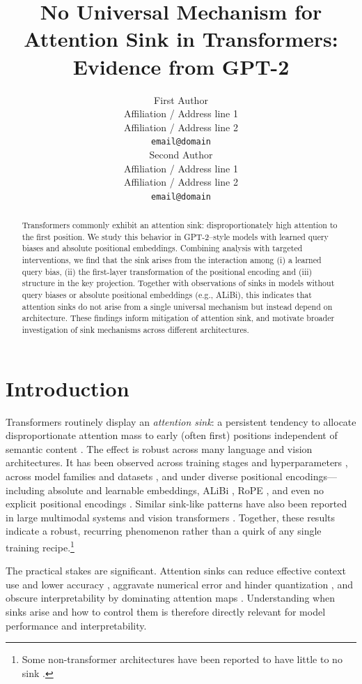 \documentclass[11pt]{article}
\title{No Universal Mechanism for Attention Sink in Transformers: \\Evidence from GPT-2}
\author{First Author \\
  Affiliation / Address line 1 \\
  Affiliation / Address line 2 \\
  \texttt{email@domain} \\\And
  Second Author \\
  Affiliation / Address line 1 \\
  Affiliation / Address line 2 \\
  \texttt{email@domain} \\
}
\date{}
\begin{document}
\maketitle

\begin{abstract}
  Transformers commonly exhibit an attention sink: disproportionately high attention to the first position. We study this behavior in GPT-2–style models with learned query biases and absolute positional embeddings. Combining analysis with targeted interventions, we find that the sink arises from the interaction among (i) a learned query bias, (ii) the first-layer transformation of the positional encoding and (iii) structure in the key projection. Together with observations of sinks in models without query biases or absolute positional embeddings (e.g., ALiBi), this indicates that attention sinks do not arise from a single universal mechanism but instead depend on architecture. These findings inform mitigation of attention sink, and motivate broader investigation of sink mechanisms across different architectures.
\end{abstract}

\section{Introduction}\label{sec:intro}

Transformers \cite{vaswani2023attentionneed} routinely display an \emph{attention sink}: a persistent tendency to allocate disproportionate attention mass to early (often first) positions independent of semantic content \citep{xiao2023efficient,gu2025when}. The effect is robust across many language and vision architectures. It has been observed across training stages and hyperparameters \citep{gu2025when,Guo2024ActiveDormantAH}, across model families and datasets \citep{xiao2023efficient}, and under diverse positional encodings—including absolute and learnable embeddings, ALiBi \citep{press2021train}, RoPE \citep{su2021roformer}, and even no explicit positional encodings \citep{gu2025when}. Similar sink-like patterns have also been reported in large multimodal systems and vision transformers \citep{Kang2025See,wang2025mirage,Feng2025EDIT}. Together, these results indicate a robust, recurring phenomenon rather than a quirk of any single training recipe.\footnote{Some non-transformer architectures have been reported to have little to no sink \citep{endy-etal-2025-mamba}.}

The practical stakes are significant. Attention sinks can reduce effective context use and lower accuracy \citep{Yu2024Unveiling,Guo2024ActiveDormantAH}, aggravate numerical error and hinder quantization \citep{sun2024massive,lin2024duquant}, and obscure interpretability by dominating attention maps \citep{Guo2024ActiveDormantAH}. Understanding when sinks arise and how to control them is therefore directly relevant for model performance and interpretability.
\end{document}
